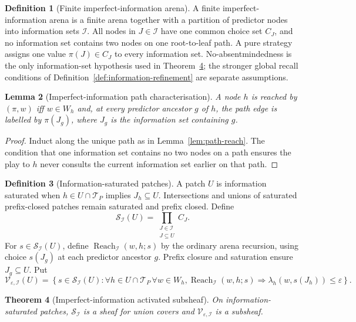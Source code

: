 \documentclass[11pt]{article}
\theoremstyle{plain}
\newtheorem{theorem}{Theorem}[section]
\newtheorem{lemma}[theorem]{Lemma}
\theoremstyle{definition}
\newtheorem{definition}[theorem]{Definition}
\theoremstyle{remark}
\newcommand{\eps}{\varepsilon}
\begin{document}
\begin{definition}[Finite imperfect-information arena]\label{def:ii-arena}
A finite imperfect-information arena is a finite arena together with a partition
of predictor nodes into information sets $\mathcal I$. All nodes in
$J\in\mathcal I$ have one common choice set $C_J$, and no information set
contains two nodes on one root-to-leaf path. A pure strategy assigns one value
$\pi(J)\in C_J$ to every information set. No-absentmindedness is the only
information-set hypothesis used in Theorem~\ref{thm:ii-sheaf}; the stronger
global recall conditions of Definition~\ref{def:information-refinement} are
separate assumptions.
\end{definition}

\begin{lemma}[Imperfect-information path characterisation]\label{lem:ii-path}
A node $h$ is reached by $(\pi,w)$ iff $w\in W_h$ and, at every predictor
ancestor $g$ of $h$, the path edge is labelled by $\pi(J_g)$, where $J_g$ is
the information set containing $g$.
\end{lemma}

\begin{proof}
Induct along the unique path as in Lemma~\ref{lem:path-reach}. The condition that
one information set contains no two nodes on a path ensures the play to $h$ never
consults the current information set earlier on that path.
\end{proof}

\begin{definition}[Information-saturated patches]\label{def:ii-patch}
A patch $U$ is information saturated when
$h\in U\cap\mathcal T_P$ implies $J_h\subseteq U$. Intersections and unions of
saturated prefix-closed patches remain saturated and prefix closed. Define
\[
\mathscr S_{\mathcal I}(U)
=\prod_{\substack{J\in\mathcal I\\J\subseteq U}}C_J.
\]
For $s\in\mathscr S_{\mathcal I}(U)$, define
$\operatorname{Reach}_{\mathcal I}(w,h;s)$ by the ordinary arena recursion,
using choice $s(J_g)$ at each predictor ancestor $g$. Prefix closure and
saturation ensure $J_g\subseteq U$. Put
\[
\mathscr V_{\eps,\mathcal I}(U)
=\left\{s\in\mathscr S_{\mathcal I}(U):
\forall h\in U\cap\mathcal T_P\,\forall w\in W_h,
\operatorname{Reach}_{\mathcal I}(w,h;s)
\Rightarrow
\lambda_h(w,s(J_h))\le\eps
\right\}.
\]
\end{definition}

\begin{theorem}[Imperfect-information activated subsheaf]\label{thm:ii-sheaf}
On information-saturated patches, $\mathscr S_{\mathcal I}$ is a sheaf for union
covers and $\mathscr V_{\eps,\mathcal I}$ is a subsheaf.
\end{theorem}
\end{document}
